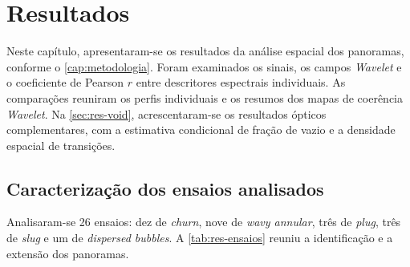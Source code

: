 \chapter{Resultados}\label{cap:resultados}

Neste capítulo, apresentaram-se os resultados da análise espacial dos panoramas,
conforme o \autoref{cap:metodologia}. Foram examinados os sinais, os campos
\textit{Wavelet} e o coeficiente de Pearson $r$ entre descritores espectrais individuais.
As comparações reuniram os perfis individuais e os resumos dos mapas de coerência \textit{Wavelet}.
Na \autoref{sec:res-void}, acrescentaram-se os resultados ópticos complementares,
com a estimativa condicional de fração de vazio e a densidade espacial de transições.

\section{Caracterização dos ensaios analisados}\label{sec:res-visao}

Analisaram-se 26 ensaios: dez de \textit{churn}, nove de \textit{wavy annular}, três de
\textit{plug}, três de \textit{slug} e um de \textit{dispersed bubbles}.
A \autoref{tab:res-ensaios} reuniu a identificação e a extensão dos panoramas.

